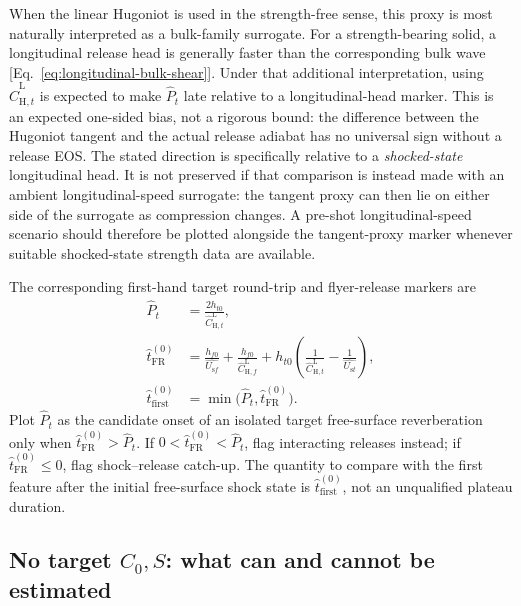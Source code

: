 \documentclass[11pt]{article}
\newcommand{\Us}[1][]{U_{\mathrm{s}#1}}
\begin{document}
When the linear Hugoniot is used in the strength-free sense, this proxy is
most naturally interpreted as a bulk-family surrogate.  For a
strength-bearing solid, a longitudinal release head is generally faster than
the corresponding bulk wave [Eq.~\eqref{eq:longitudinal-bulk-shear}].
Under that additional interpretation, using
$\widehat C_{\mathrm H,t}^{\mathrm L}$ is expected to make
$\widehat P_t$ late relative to a longitudinal-head marker.  This is an
expected one-sided bias, not a rigorous bound: the difference between the
Hugoniot tangent and the actual release adiabat has no universal sign without
a release EOS.  The stated direction is specifically relative to a
\emph{shocked-state} longitudinal head.  It is not preserved if that
comparison is instead made with an ambient longitudinal-speed surrogate:
the tangent proxy can then lie on either side of the surrogate as compression
changes.  A pre-shot longitudinal-speed scenario should therefore be plotted
alongside the tangent-proxy marker whenever suitable shocked-state strength
data are available.

The corresponding first-hand target round-trip and flyer-release markers are
\begin{align}
  \widehat P_t&=\frac{2h_{t0}}{\widehat C_{\mathrm{H},t}^{\mathrm L}}, \\
  \widehat t_{\mathrm{FR}}^{(0)}
  &=\frac{h_{f0}}{\widehat{\Us[f]}}
    +\frac{h_{f0}}{\widehat C_{\mathrm{H},f}^{\mathrm L}}
    +h_{t0}\left(
      \frac{1}{\widehat C_{\mathrm{H},t}^{\mathrm L}}
      -\frac{1}{\widehat{\Us[t]}}\right), \\
  \widehat t_{\mathrm{first}}^{(0)}
  &=\min\bigl(\widehat P_t,\widehat t_{\mathrm{FR}}^{(0)}\bigr).
  \label{eq:first-hand-markers}
\end{align}
Plot $\widehat P_t$ as the candidate onset of an isolated target
free-surface reverberation only when
$\widehat t_{\mathrm{FR}}^{(0)}>\widehat P_t$.  If
$0<\widehat t_{\mathrm{FR}}^{(0)}<\widehat P_t$, flag interacting releases
instead; if $\widehat t_{\mathrm{FR}}^{(0)}\leq0$, flag shock--release
catch-up.  The quantity to compare with the first feature after the initial
free-surface shock state is $\widehat t_{\mathrm{first}}^{(0)}$, not an
unqualified plateau duration.

\subsection{No target $C_0,S$: what can and cannot be estimated}
\end{document}
